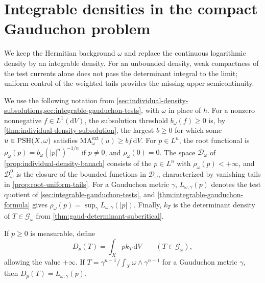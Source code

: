 \section{Integrable densities in the compact Gauduchon problem}
\label{sec:integrable-gauduchon-currents}

We keep the Hermitian background $\omega$ and replace the continuous logarithmic density by an integrable density. For an unbounded density, weak compactness of the test currents alone does not pass the determinant integral to the limit; uniform control of the weighted tails provides the missing upper semicontinuity.

We use the following notation from \cref{sec:individual-density-subsolutions,sec:integrable-gauduchon-tests}, with $\omega$ in place of $h$. For a nonzero nonnegative $f\in L^1(\mathrm{d}V)$, the subsolution threshold $b_\omega(f)\geq0$ is, by \cref{thm:individual-density-subsolution}, the largest $b\geq0$ for which some $u\in\mathrm{PSH}(X,\omega)$ satisfies $\mathrm{MA}^{\mathrm{ext}}_\omega(u)\geq bf\,\mathrm{d}V$. For $p\in L^n$, the root functional is $\rho_\omega(p)=b_\omega(|p|^n)^{-1/n}$ if $p\ne0$, and $\rho_\omega(0)=0$. The space $\mathcal D_\omega$ of \cref{prop:individual-density-banach} consists of the $p\in L^n$ with $\rho_\omega(p)<+\infty$, and $\mathcal D_\omega^0$ is the closure of the bounded functions in $\mathcal D_\omega$, characterized by vanishing tails in \cref{prop:root-uniform-tails}. For a Gauduchon metric $\gamma$, $L_{\omega,\gamma}(p)$ denotes the test quotient of \cref{sec:integrable-gauduchon-tests}, and \cref{thm:integrable-gauduchon-formula} gives $\rho_\omega(p)=\sup_\gamma L_{\omega,\gamma}(|p|)$. Finally, $k_T$ is the determinant density of $T\in\mathscr G_\omega$ from \cref{thm:gaud-determinant-subcritical}.

If $p\geq0$ is measurable, define
\[
 D_p(T)=\int_Xp k_T\,\mathrm{d}V\qquad(T\in\mathscr G_\omega),
\]
allowing the value $+\infty$. If $T=\gamma^{n-1}/\int_X\omega\wedge\gamma^{n-1}$ for a Gauduchon metric $\gamma$, then $D_p(T)=L_{\omega,\gamma}(p)$.

